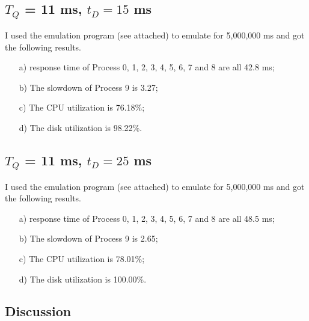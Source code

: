 \documentclass[12pt,letterpaper]{article}
\begin{document}
\subsection{$T_Q$ = 11 ms, $t_D=15$ ms}
I used the emulation program (see attached) to emulate for 5,000,000 ms and got the following results.
\begin{enumerate}
\item[a)] response time of Process 0, 1, 2, 3, 4, 5, 6, 7 and 8 are all 42.8 ms;
\item[b)] The slowdown of Process 9 is 3.27;
\item[c)] The CPU utilization is 76.18\%;
\item[d)] The disk utilization is 98.22\%.
\end{enumerate}

\subsection{$T_Q$ = 11 ms, $t_D=25$ ms}
I used the emulation program (see attached) to emulate for 5,000,000 ms and got the following results.
\begin{enumerate}
\item[a)] response time of Process 0, 1, 2, 3, 4, 5, 6, 7 and 8 are all 48.5 ms;
\item[b)] The slowdown of Process 9 is 2.65;
\item[c)] The CPU utilization is 78.01\%;
\item[d)] The disk utilization is 100.00\%.
\end{enumerate}

\subsection{Discussion}
\end{document}
